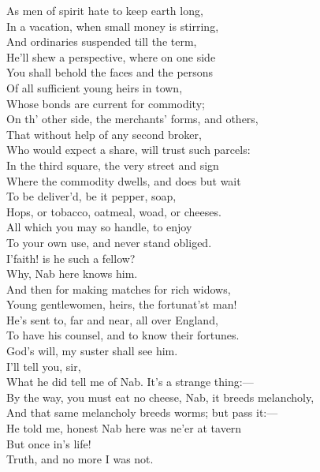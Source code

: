 \documentclass[a4paper,oneside]{memoir}
\begin{document}
\begin{drama*}
As men of spirit hate to keep earth long,\\
In a vacation, when small money is stirring,\\
And ordinaries suspended till the term,\\
He'll shew a perspective, where on one side\\
You shall behold the faces and the persons\\
Of all sufficient young heirs in town,\\
Whose bonds are current for commodity;\\
On th' other side, the merchants' forms, and others,\\
That without help of any second broker,\\
Who would expect a share, will trust such parcels:\\
In the third square, the very street and sign\\
Where the commodity dwells, and does but wait\\
To be deliver'd, be it pepper, soap,\\
Hops, or tobacco, oatmeal, woad, or cheeses.\\
All which you may so handle, to enjoy\\
To your own use, and never stand obliged.\\
\kastrilspeaks I'faith! is he such a fellow?\\
\facespeaks {} Why, Nab here knows him.\\
And then for making matches for rich widows,\\
Young gentlewomen, heirs, the fortunat'st man!\\
He's sent to, far and near, all over England,\\
To have his counsel, and to know their fortunes.\\
\kastrilspeaks God's will, my suster shall see him.\\
\facespeaks {} I'll tell you, sir,\\
What he did tell me of Nab. It's a strange thing:---\\
By the way, you must eat no cheese, Nab, it breeds melancholy,\\
And that same melancholy breeds worms; but pass it:---\\
He told me, honest Nab here was ne'er at tavern\\
But once in's life!\\
\druggerspeaks {} Truth, and no more I was not.\\

\end{drama*}
\end{document}
